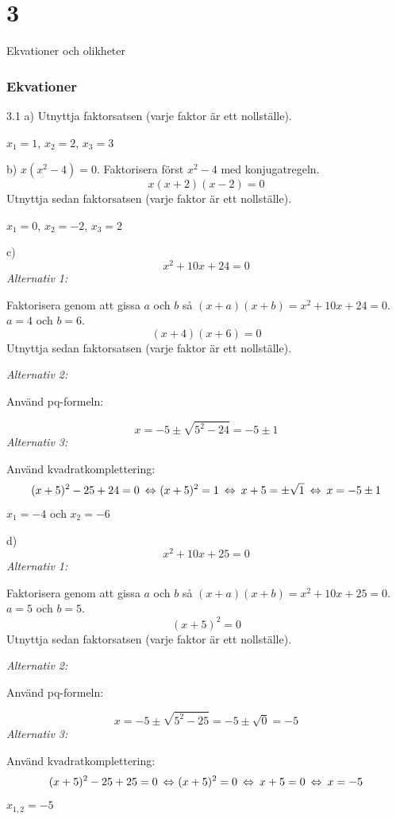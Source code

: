 \chapter{3}{Ekvationer och olikheter}
\subsection*{Ekvationer}

\begin{task}{3.1 a)}
	Utnyttja faktorsatsen (varje faktor är ett nollställe).
	
	\ans $x_1=1$, $x_2=2$, $x_3=3$
\end{task}

\begin{task}{b)}
	$x(x^2-4)=0$. Faktorisera först $x^2-4$ med konjugatregeln.
	\[x(x+2)(x-2)=0\]
	Utnyttja sedan faktorsatsen (varje faktor är ett nollställe).
	
	\ans $x_1=0$, $x_2=-2$, $x_3=2$
\end{task}

\begin{task}{c)}
	\[x^2+10x+24=0\]
	\emph{Alternativ 1:}
	
	Faktorisera genom att gissa $a$ och $b$ så $(x+a)(x+b)=x^2+10x+24=0$. $a = 4$ och $b = 6$.
	\[(x+4)(x+6)=0\]
	Utnyttja sedan faktorsatsen (varje faktor är ett nollställe).
	
	\emph{Alternativ 2:}
	
	Använd pq-formeln:
	
	\[x=-5\pm\sqrt{5^2-24}=-5\pm 1\]
	\emph{Alternativ 3:}
	
	Använd kvadratkomplettering:
	\[(x+5)^2-25+24=0 \lra (x+5)^2=1 \lra x+5=\pm \sqrt{1} \lra x=-5\pm 1\]
	\ans $x_1=-4$ och $x_2=-6$
\end{task}

\begin{task}{d)}
	\[x^2+10x+25=0\]
	\emph{Alternativ 1:}
	
	Faktorisera genom att gissa $a$ och $b$ så $(x+a)(x+b)=x^2+10x+25=0$. $a = 5$ och $b = 5$.
	\[(x+5)^2=0\]
	Utnyttja sedan faktorsatsen (varje faktor är ett nollställe).
	
	\emph{Alternativ 2:}
	
	Använd pq-formeln:
	
	\[x=-5\pm\sqrt{5^2-25}=-5\pm \sqrt{0}=-5\]
	\emph{Alternativ 3:}
	
	Använd kvadratkomplettering:
	\[(x+5)^2-25+25=0 \lra (x+5)^2=0 \lra x+5=0 \lra x=-5\]
	\ans $x_{1,2}=-5$
\end{task}

